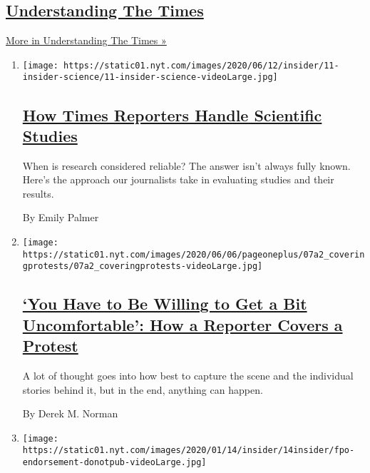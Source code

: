 \hypertarget{understanding-the-times}{%
\subsection{\texorpdfstring{\href{/series/understanding-the-times}{Understanding
The Times}}{Understanding The Times}}\label{understanding-the-times}}

\href{/series/understanding-the-times}{More in Understanding The Times
»}

\begin{enumerate}
\def\labelenumi{\arabic{enumi}.}
\item
  \texttt{[image: https://static01.nyt.com/images/2020/06/12/insider/11-insider-science/11-insider-science-videoLarge.jpg]}

  \hypertarget{how-times-reporters-handle-scientific-studies}{%
  \subsection{\texorpdfstring{\href{/2020/06/09/insider/reporters-scientific-studies.html}{How
  Times Reporters Handle Scientific
  Studies}}{How Times Reporters Handle Scientific Studies}}\label{how-times-reporters-handle-scientific-studies}}

  When is research considered reliable? The answer isn't always fully
  known. Here's the approach our journalists take in evaluating studies
  and their results.

  By Emily Palmer
\item
  \texttt{[image: https://static01.nyt.com/images/2020/06/06/pageoneplus/07a2\_coveringprotests/07a2\_coveringprotests-videoLarge.jpg]}

  \hypertarget{you-have-to-be-willing-to-get-a-bit-uncomfortable-how-a-reporter-covers-a-protest}{%
  \subsection{\texorpdfstring{\href{/2020/06/06/reader-center/covering-protests.html}{`You
  Have to Be Willing to Get a Bit Uncomfortable': How a Reporter Covers
  a
  Protest}}{`You Have to Be Willing to Get a Bit Uncomfortable': How a Reporter Covers a Protest}}\label{you-have-to-be-willing-to-get-a-bit-uncomfortable-how-a-reporter-covers-a-protest}}

  A lot of thought goes into how best to capture the scene and the
  individual stories behind it, but in the end, anything can happen.

  By Derek M. Norman
\item
  \texttt{[image: https://static01.nyt.com/images/2020/01/14/insider/14insider/fpo-endorsement-donotpub-videoLarge.jpg]}


\end{enumerate}
